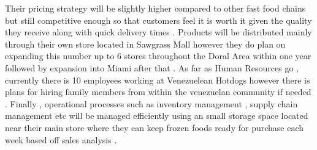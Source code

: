 Their pricing strategy will be slightly higher compared to other fast food chains but still competitive enough so that customers feel it is worth it given the quality they receive along with quick delivery times . Products will be distributed mainly through their own store located in Sawgrass Mall however they do plan on expanding this number up to 6 stores throughout the Doral Area within one year followed by expansion into Miami after that .  As far as Human Resources go , currently there is 10 employees working at Venezuelean Hotdogs however there is plans for hiring family members from within the venezuelan community if needed . Finally , operational processes such as inventory management , supply chain management etc will be managed efficiently using an small storage space located near their main store where they can keep frozen foods ready for purchase each week based off sales analysis .  

